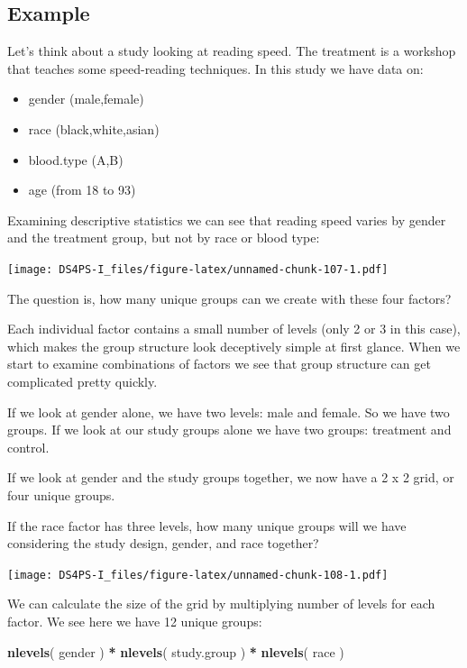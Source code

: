 \documentclass[]{book}
\newenvironment{Shaded}{\begin{snugshade}}{\end{snugshade}}
\newcommand{\KeywordTok}[1]{\textcolor[rgb]{0.13,0.29,0.53}{\textbf{#1}}}
\newcommand{\NormalTok}[1]{#1}
\newcommand{\OperatorTok}[1]{\textcolor[rgb]{0.81,0.36,0.00}{\textbf{#1}}}
\newcommand{\StringTok}[1]{\textcolor[rgb]{0.31,0.60,0.02}{#1}}
\providecommand{\tightlist}{%
  \setlength{\itemsep}{0pt}\setlength{\parskip}{0pt}}
\theoremstyle{definition}
\theoremstyle{definition}
\theoremstyle{definition}
\theoremstyle{remark}
\begin{document}
\hypertarget{example}{%
\subsection{Example}\label{example}}

Let's think about a study looking at reading speed. The treatment is a
workshop that teaches some speed-reading techniques. In this study we
have data on:

\begin{itemize}
\tightlist
\item
  gender (male,female)
\item
  race (black,white,asian)
\item
  blood.type (A,B)
\item
  age (from 18 to 93)
\end{itemize}

Examining descriptive statistics we can see that reading speed varies by
gender and the treatment group, but not by race or blood type:

\texttt{[image: DS4PS-I\_files/figure-latex/unnamed-chunk-107-1.pdf]}

The question is, how many unique groups can we create with these four
factors?

Each individual factor contains a small number of levels (only 2 or 3 in
this case), which makes the group structure look deceptively simple at
first glance. When we start to examine combinations of factors we see
that group structure can get complicated pretty quickly.

If we look at gender alone, we have two levels: male and female. So we
have two groups. If we look at our study groups alone we have two
groups: treatment and control.

If we look at gender and the study groups together, we now have a 2 x 2
grid, or four unique groups.

If the race factor has three levels, how many unique groups will we have
considering the study design, gender, and race together?

\texttt{[image: DS4PS-I\_files/figure-latex/unnamed-chunk-108-1.pdf]}

We can calculate the size of the grid by multiplying number of levels
for each factor. We see here we have 12 unique groups:

\begin{Shaded}
\begin{Highlighting}[]
\KeywordTok{nlevels}\NormalTok{( gender ) }\OperatorTok{*}\StringTok{ }\KeywordTok{nlevels}\NormalTok{( study.group ) }\OperatorTok{*}\StringTok{ }\KeywordTok{nlevels}\NormalTok{( race )}
\end{Highlighting}
\end{Shaded}
\end{document}

